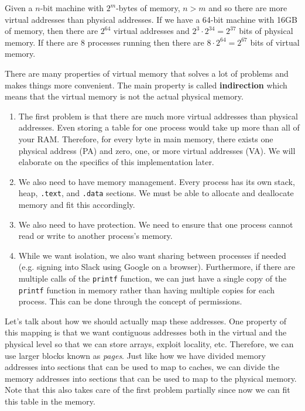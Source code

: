 \documentclass{article}
\begin{document}
    \begin{example}
      Given a $n$-bit machine with $2^m$-bytes of memory, $n > m$ and so there are more virtual addresses than physical addresses. If we have a 64-bit machine with 16GB of memory, then there are $2^{64}$ virtual addresses and $2^{3} \cdot 2^{34} = 2^{37}$ bits of physical memory. If there are 8 processes running then there are $8 \cdot 2^{64} = 2^{67}$ bits of virtual memory. 
    \end{example}

    There are many properties of virtual memory that solves a lot of problems and makes things more convenient. The main property is called \textbf{indirection} which means that the virtual memory is not the actual physical memory. 
    \begin{enumerate}
      \item The first problem is that there are much more virtual addresses than physical addresses. Even storing a table for one process would take up more than all of your RAM. Therefore, for every byte in main memory, there exists one physical address (PA) and zero, one, or more virtual addresses (VA). We will elaborate on the specifics of this implementation later. 
      \item We also need to have memory management. Every process has its own stack, heap, \texttt{.text}, and \texttt{.data} sections. We must be able to allocate and deallocate memory and fit this accordingly. 
      \item We also need to have protection. We need to ensure that one process cannot read or write to another process's memory.
      \item While we want isolation, we also want sharing between processes if needed (e.g. signing into Slack using Google on a browser). Furthermore, if there are multiple calls of the \texttt{printf} function, we can just have a single copy of the \texttt{printf} function in memory rather than having multiple copies for each process. This can be done through the concept of permissions. 
    \end{enumerate}

    Let's talk about how we should actually map these addresses. One property of this mapping is that we want contiguous addresses both in the virtual and the physical level so that we can store arrays, exploit locality, etc. Therefore, we can use larger blocks known as \textit{pages}. Just like how we have divided memory addresses into sections that can be used to map to caches, we can divide the memory addresses into sections that can be used to map to the physical memory. Note that this also takes care of the first problem partially since now we can fit this table in the memory. 
      
\end{document}
